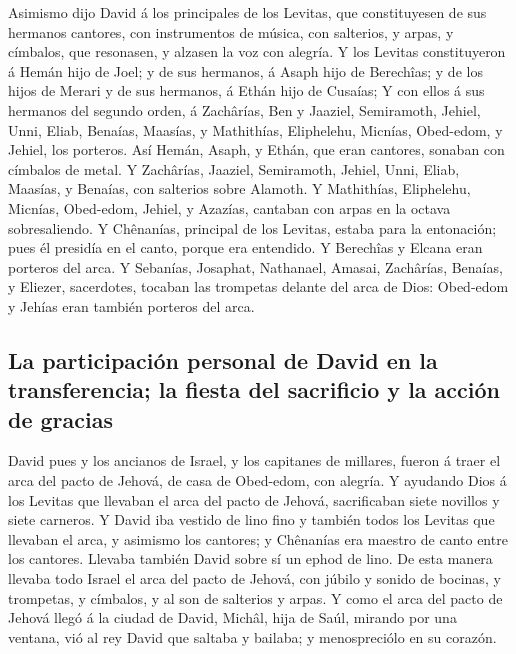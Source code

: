  Asimismo dijo David á los principales de los Levitas, que
constituyesen de sus hermanos cantores, con instrumentos de música, con
salterios, y arpas, y címbalos, que resonasen, y alzasen la voz con
alegría.  Y los Levitas constituyeron á Hemán hijo de Joel;
y de sus hermanos, á Asaph hijo de Berechîas; y de los hijos de Merari y
de sus hermanos, á Ethán hijo de Cusaías;  Y con ellos á
sus hermanos del segundo orden, á Zachârías, Ben y Jaaziel, Semiramoth,
Jehiel, Unni, Eliab, Benaías, Maasías, y Mathithías, Eliphelehu,
Micnías, Obed-edom, y Jehiel, los porteros.  Así Hemán,
Asaph, y Ethán, que eran cantores, sonaban con címbalos de metal.
 Y Zachârías, Jaaziel, Semiramoth, Jehiel, Unni, Eliab,
Maasías, y Benaías, con salterios sobre Alamoth.  Y
Mathithías, Eliphelehu, Micnías, Obed-edom, Jehiel, y Azazías, cantaban
con arpas en la octava sobresaliendo.  Y Chênanías,
principal de los Levitas, estaba para la entonación; pues él presidía en
el canto, porque era entendido.  Y Berechîas y Elcana eran
porteros del arca.  Y Sebanías, Josaphat, Nathanael,
Amasai, Zachârías, Benaías, y Eliezer, sacerdotes, tocaban las trompetas
delante del arca de Dios: Obed-edom y Jehías eran también porteros del
arca.

\hypertarget{la-participaciuxf3n-personal-de-david-en-la-transferencia-la-fiesta-del-sacrificio-y-la-acciuxf3n-de-gracias}{%
\subsection{La participación personal de David en la transferencia; la
fiesta del sacrificio y la acción de
gracias}\label{la-participaciuxf3n-personal-de-david-en-la-transferencia-la-fiesta-del-sacrificio-y-la-acciuxf3n-de-gracias}}

 David pues y los ancianos de Israel, y los capitanes de
millares, fueron á traer el arca del pacto de Jehová, de casa de
Obed-edom, con alegría.  Y ayudando Dios á los Levitas que
llevaban el arca del pacto de Jehová, sacrificaban siete novillos y
siete carneros.  Y David iba vestido de lino fino y también
todos los Levitas que llevaban el arca, y asimismo los cantores; y
Chênanías era maestro de canto entre los cantores. Llevaba también David
sobre sí un ephod de lino.  De esta manera llevaba todo
Israel el arca del pacto de Jehová, con júbilo y sonido de bocinas, y
trompetas, y címbalos, y al son de salterios y arpas.  Y
como el arca del pacto de Jehová llegó á la ciudad de David, Michâl,
hija de Saúl, mirando por una ventana, vió al rey David que saltaba y
bailaba; y menospreciólo en su corazón.

